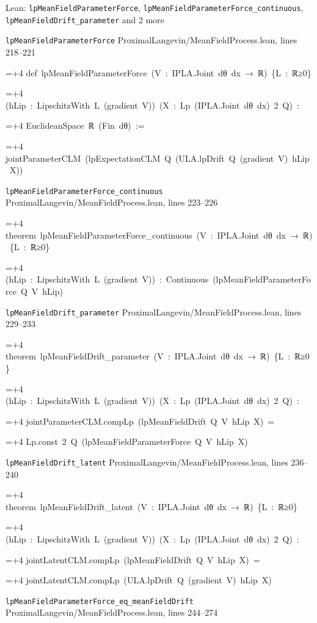 \documentclass[11pt,a4paper]{article}
\newlength{\leancharwidth}
\newenvironment{leancode}{\par\smallskip\begingroup\ttfamily\footnotesize\raggedright
  \settowidth{\leancharwidth}{M}\setlength{\parskip}{0pt}\setlength{\parindent}{0pt}
  \frenchspacing}{\par\endgroup\smallskip}
\newcommand{\leanline}[2]{\hangindent=\dimexpr#1\leancharwidth+4\leancharwidth\relax
  \hangafter=1\noindent\hspace*{#1\leancharwidth}#2\par}
\newcommand{\leansource}[1]{\par{\footnotesize\color{leanmuted}#1}\par}
\begin{document}
\begin{leanbox}{Lean: \texttt{lpMeanFieldParameterForce}, \texttt{lpMeanFieldParameterForce\_\allowbreak{}continuous}, \texttt{lpMeanFieldDrift\_\allowbreak{}parameter} and 2 more}
\leansource{\texttt{lpMeanFieldParameterForce} \quad ProximalLangevin/\allowbreak{}MeanFieldProcess.lean, lines 218–221}
\begin{leancode}
\leanline{0}{def\ lpMeanFieldParameterForce\ (V\ :\ IPLA.Joint\ dθ\ dx\ →\ ℝ)\ \{L\ :\ ℝ≥0\}}
\leanline{4}{(hLip\ :\ LipschitzWith\ L\ (gradient\ V))\ (X\ :\ Lp\ (IPLA.Joint\ dθ\ dx)\ 2\ Q)\ :}
\leanline{4}{EuclideanSpace\ ℝ\ (Fin\ dθ)\ :=}
\leanline{2}{jointParameterCLM\ (lpExpectationCLM\ Q\ (ULA.lpDrift\ Q\ (gradient\ V)\ hLip\ X))}
\end{leancode}
\leansource{\texttt{lpMeanFieldParameterForce\_\allowbreak{}continuous} \quad ProximalLangevin/\allowbreak{}MeanFieldProcess.lean, lines 223–226}
\begin{leancode}
\leanline{0}{theorem\ lpMeanFieldParameterForce\_continuous\ (V\ :\ IPLA.Joint\ dθ\ dx\ →\ ℝ)\ \{L\ :\ ℝ≥0\}}
\leanline{4}{(hLip\ :\ LipschitzWith\ L\ (gradient\ V))\ :\ Continuous\ (lpMeanFieldParameterForce\ Q\ V\ hLip)}
\end{leancode}
\leansource{\texttt{lpMeanFieldDrift\_\allowbreak{}parameter} \quad ProximalLangevin/\allowbreak{}MeanFieldProcess.lean, lines 229–233}
\begin{leancode}
\leanline{0}{theorem\ lpMeanFieldDrift\_parameter\ (V\ :\ IPLA.Joint\ dθ\ dx\ →\ ℝ)\ \{L\ :\ ℝ≥0\}}
\leanline{4}{(hLip\ :\ LipschitzWith\ L\ (gradient\ V))\ (X\ :\ Lp\ (IPLA.Joint\ dθ\ dx)\ 2\ Q)\ :}
\leanline{4}{jointParameterCLM.compLp\ (lpMeanFieldDrift\ Q\ V\ hLip\ X)\ =}
\leanline{6}{Lp.const\ 2\ Q\ (lpMeanFieldParameterForce\ Q\ V\ hLip\ X)}
\end{leancode}
\leansource{\texttt{lpMeanFieldDrift\_\allowbreak{}latent} \quad ProximalLangevin/\allowbreak{}MeanFieldProcess.lean, lines 236–240}
\begin{leancode}
\leanline{0}{theorem\ lpMeanFieldDrift\_latent\ (V\ :\ IPLA.Joint\ dθ\ dx\ →\ ℝ)\ \{L\ :\ ℝ≥0\}}
\leanline{4}{(hLip\ :\ LipschitzWith\ L\ (gradient\ V))\ (X\ :\ Lp\ (IPLA.Joint\ dθ\ dx)\ 2\ Q)\ :}
\leanline{4}{jointLatentCLM.compLp\ (lpMeanFieldDrift\ Q\ V\ hLip\ X)\ =}
\leanline{6}{jointLatentCLM.compLp\ (ULA.lpDrift\ Q\ (gradient\ V)\ hLip\ X)}
\end{leancode}
\leansource{\texttt{lpMeanFieldParameterForce\_\allowbreak{}eq\_\allowbreak{}meanFieldDrift} \quad ProximalLangevin/\allowbreak{}MeanFieldProcess.lean, lines 244–274}

\end{leanbox}
\end{document}
